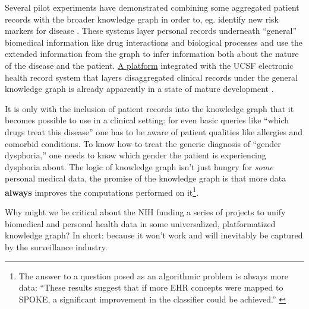 Several pilot experiments have demonstrated combining some aggregated
patient records with the broader knowledge graph in order to, eg.
identify new risk markers for disease \cite{morrisScalablePrecisionMedicine2023, nelsonEmbeddingElectronicHealth2021, translatorconsortiumClinicalDataServices2020, nelsonIntegratingBiomedicalResearch2019} . These systems layer
personal records underneath ``general'' biomedical information like drug
interactions and biological processes and use the extended information
from the graph to infer information both about the nature of the disease
and the patient. \href{https://www.matebioservices.com/bridge}{A
platform} integrated with the UCSF electronic health record system that
layers disaggregated clinical records under the general knowledge graph
is already apparently in a state of mature development \cite{universityofcaliforniasanfranciscoBRIDGE} .

It is only with the inclusion of patient records into the knowledge
graph that it becomes possible to use in a clinical setting: for even
basic queries like ``which drugs treat this disease'' one has to be
aware of patient qualities like allergies and comorbid conditions. To
know how to treat the generic diagnosis of ``gender dysphoria,'' one
needs to know which gender the patient is experiencing dysphoria about.
The logic of knowledge graph isn't just hungry for \emph{some} personal
medical data, the promise of the knowledge graph is that more data
\textbf{always} improves the computations performed on it\footnote{The
  answer to a question posed as an algorithmic problem is always more
  data: ``These results suggest that if more EHR concepts were mapped to
  SPOKE, a significant improvement in the classifier could be
  achieved.'' \cite{nelsonEmbeddingElectronicHealth2021} }.

Why might we be critical about the NIH funding a series of projects to
unify biomedical and personal health data in some universalized,
platformatized knowledge graph? In short: because it won't work and will
inevitably be captured by the surveillance industry.


